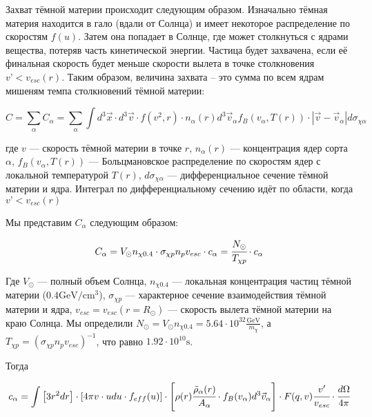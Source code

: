 

Захват тёмной материи происходит следующим образом. Изначально тёмная материя находится в гало (вдали от Солнца) и имеет некоторое распределение по скоростям $f(u)$. Затем она попадает в Солнце, где может столкнуться с ядрами вещества, потеряв часть кинетической энергии. Частица будет захвачена, если её финальная скорость будет меньше скорости вылета в точке столкновения $v’ < v_{esc}(r)$. Таким образом, величина захвата – это сумма по всем ядрам мишеням темпа столкновений тёмной материи:

\begin{equation}
	\label{eq:Capture_Full}
	C = \sum_{\alpha} C_{\alpha} = \sum_{\alpha} \int{
		d^3\vec{x} \cdot d^3\vec{v} \cdot f(v^2,r) \cdot n_{\alpha}(r) 
		d^3\vec{v}_{\alpha} f_B(v_{\alpha},T(r)) \cdot
		|\vec{v}- \vec{v}_{\alpha}| d\sigma_{\chi \alpha}
	}
\end{equation}

где $v$ --- скорость тёмной материи в точке $r$, $n_{\alpha}(r)$ --- концентрация ядер сорта $\alpha$, $f_B(v_{\alpha},T(r))$ --- Больцмановское распределение по скоростям ядер с локальной температурой $T(r)$, $d\sigma_{\chi \alpha}$ --- дифференциальное сечение тёмной материи и ядра. Интеграл по дифференциальному сечению идёт по области, когда $v’ < v_{esc}(r)$

Мы представим $C_{\alpha}$ следующим образом:

\begin{equation}
	\label{eq:Capture_a}
	C_{\alpha} = V_{\odot} n_{\chi 0.4} \cdot
	\sigma_{\chi p} n_{p} v_{esc} \cdot c_{\alpha} = 
	\cfrac{N_{\odot}}{T_{\chi p}} \cdot c_{\alpha}
\end{equation}

Где $V_{\odot}$ --- полный объем Солнца, $n_{\chi 0.4}$ --- локальная концентрация частиц тёмной материи ($0.4 \text{GeV}/\text{cm}^{3}$), $\sigma_{\chi p}$ --- характерное сечение взаимодействия тёмной материи и ядра, $v_{esc} = v_{esc}(r = R_{\odot})$ --- скорость вылета тёмной материи на краю Солнца. Мы определили $N_{\odot} = V_{\odot} n_{\chi 0.4} = 5.64\cdot10^{32} \frac{\text{GeV}}{m_{\chi}}$, а $T_{\chi p} = (\sigma_{\chi p} n_{p} v_{esc})^{-1}$, что равно $1.92\cdot 10^{10} \text{s}$.

Тогда 

\begin{equation}
	\label{eq:ca_coeff}
	c_{\alpha} = \int  \left[3r^2 dr  \right] \cdot \left[4\pi v \cdot u d u \cdot f_{eff}(u)  \right]  \cdot 
	\left[ \rho(r)\cfrac{\tilde{\rho}_{\alpha}(r)}{A_{\alpha}}  \cdot f_B(v_{\alpha}) d^3 \vec{v}_{\alpha} 
	\right] \cdot F(q,v) \cfrac{v'}{v_{esc}} \cdot \cfrac{d \Omega}{4\pi} 
\end{equation}

